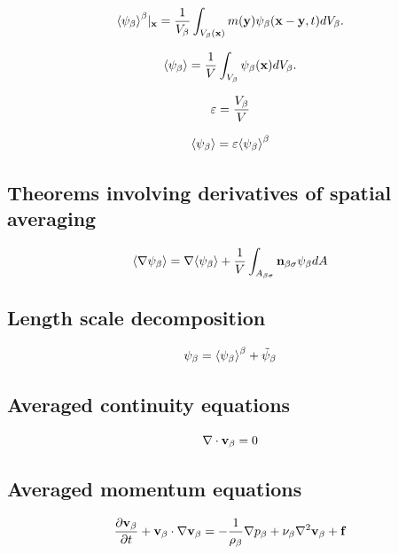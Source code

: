 \begin{equation}
{\left< \psi_{\beta} \right>}^{\beta}|_{\mathbf{x}} = \dfrac{1}{V_\beta} \int_{V_\beta(\mathbf{x})}  m(\mathbf{y}) \psi_{\beta}(\mathbf{x}-\mathbf{y}, t) d V_\beta.
\label{eq:avg_intrinsic_ext}
\end{equation}

\begin{equation}
{\left< \psi_{\beta} \right>} = \dfrac{1}{V} \int_{V_\beta} \psi_\beta (\mathbf{x}) d V_\beta.
\label{eq:avg_superficial}
\end{equation}


\begin{equation}
	\varepsilon = \dfrac{V_\beta}{V}
	\label{eq:porosity}
\end{equation}

\begin{equation}
	{\left< \psi_{\beta} \right>} =  \varepsilon {\left< \psi_{\beta} \right>}^{\beta}
\end{equation}

\subsection{Theorems involving derivatives of spatial averaging}

\begin{theorem}
\[	{\left< \nabla \psi_{\beta} \right>} = \nabla {\left< \psi_{\beta} \right>} + \dfrac{1}{V}\int_{A_{\beta \sigma}} \mathbf{n}_{\beta \sigma} \psi_{\beta} dA \]
\end{theorem}


\subsection{Length scale decomposition}

\begin{equation}
	\psi_{\beta} = {\left< \psi_{\beta} \right>}^{\beta} + \tilde{\psi}_{\beta}
 \end{equation}

\subsection{Averaged continuity equations}


\begin{equation}
\nabla \cdot \textbf{v}_{\beta} = 0
\label{eq:cont}
\end{equation}

\subsection{Averaged momentum equations}


\begin{equation}
\dfrac{\partial \textbf{v}_{\beta}}{\partial t} + \textbf{v}_{\beta} \cdot \nabla \textbf{v}_{\beta} = -\frac{1}{\rho_{\beta}} \nabla p_{\beta} + \nu_{\beta} \nabla^2  \textbf{v}_{\beta}  + \mathbf{f}
\label{eq:mom}
\end{equation}